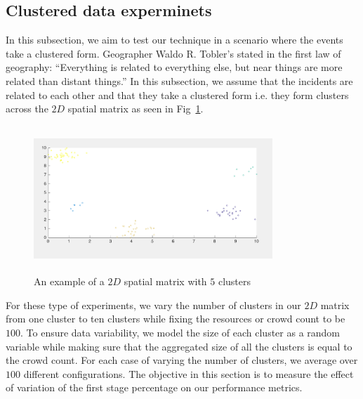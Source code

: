 \documentclass{acm_proc_article-sp}
\begin{document}
\subsection{Clustered data experminets}
In this subsection, we aim to test our technique in a scenario where the events take a clustered form. Geographer Waldo R. Tobler's stated in the first law of geography: ``Everything is related to everything else, but near things are more related than distant things.'' In this subsection, we assume that the incidents are related to each other and that they take a clustered form i.e. they form clusters across the $2D$ spatial matrix as seen in Fig~\ref{fig: clust}. \par
\begin{figure}[!h]
\centering
   \includegraphics[width=9cm ,height=5.5cm]{figuresPng/clust.png}
   \caption{An example of a $2D$ spatial matrix with $5$ clusters }\label{fig: clust}
\end{figure}
For these type of experiments, we vary the number of clusters in our $2D$ matrix from one cluster to ten clusters while fixing the resources or crowd count to be $100$. To ensure data variability, we model the size of each cluster as a random variable while making sure that the aggregated size of all the clusters is equal to the crowd count. For each case of varying the number of clusters, we average over $100$ different configurations. The objective in this section is to measure the effect of variation of the first stage percentage on our performance metrics.\par
\end{document}
